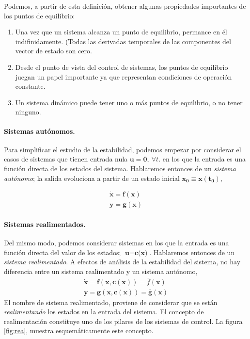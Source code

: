 Podemos, a partir de esta definición, obtener algunas propiedades importantes de los puntos de equilibrio:
\begin{enumerate}
\item Una vez que un sistema alcanza un punto de equilibrio, permance en él indifinidamente. (Todas las derivadas temporales de las componentes del vector de estado son cero.
\item Desde el punto de vista del control de sistemas, los puntos de equilibrio juegan un papel importante ya que representan condiciones de operación constante.
\item Un sistema dinámico puede tener uno o más puntos de equilibrio, o no tener ninguno. 
\end{enumerate}

\paragraph{Sistemas autónomos.} Para simplificar el estudio de la estabilidad, podemos empezar por considerar el casos de sistemas que tienen entrada nula $\mathbf{u} = \mathbf{0}, \ \forall t$. en los que la entrada es una función directa de los estados del sistema. Hablaremos entonces de un \emph{sistema autónomo}; la salida evoluciona a partir de un estado inicial $\mathbf{x_0}\equiv \mathbf{x(t_0)}$,

\begin{align}
\mathbf{\dot{x}} = \mathbf{f}(\mathbf{x})\\
\mathbf{y} = \mathbf{g}(\mathbf{x})
\end{align}

\paragraph{Sistemas realimentados.} Del mismo modo, podemos considerar sistemas en los que la entrada es una función directa del valor de los estados; $\textbf{u}= \textbf{c(x)}$. Hablaremos entonces de un \emph{sistema realimentado}. A efectos de análisis de la estabilidad del sistema, no hay diferencia entre un sistema realimentado y un sistema autónomo,
\begin{align}
\mathbf{\dot{x}} = \mathbf{f}(\mathbf{x},\mathbf{c(x)}) = \bar{f}(\mathbf{x})\\
\mathbf{y} = \mathbf{g}(\mathbf{x},\mathbf{c(x)}) = \bar{\mathbf{g}}(\mathbf{x})
\end{align}
El nombre de sistema realimentado, proviene de considerar que se están \emph{realimentando} los estados en la entrada del sistema. El concepto de realimentación constituye uno de los pilares de los sistemas de control. La figura \ref{fig:rea}, muestra esquemáticamente este concepto.

